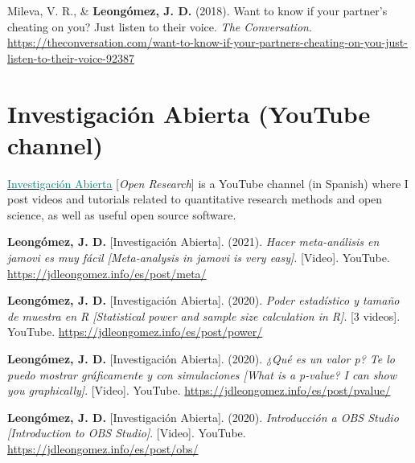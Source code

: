 \documentclass[11pt, a4paper]{awesome-cv}
\begin{document}
\leavevmode{}%
Mileva, V. R., \& \textbf{Leongómez, J. D.} (2018). {Want to know if
your partner's cheating on you? Just listen to their voice}. \emph{The
Conversation}.
\url{https://theconversation.com/want-to-know-if-your-partners-cheating-on-you-just-listen-to-their-voice-92387}

\endgroup

\hypertarget{investigaciuxf3n-abierta-youtube-channel}{%
\section{Investigación Abierta (YouTube
channel)}\label{investigaciuxf3n-abierta-youtube-channel}}

\href{https://www.youtube.com/c/InvestigaciónAbierta}{\textcolor{red}{\faYoutubePlay}
\textcolor{teal}{Investigación Abierta}} {[}\textit{Open Research}{]} is
a YouTube channel (in Spanish) where I post videos and tutorials related
to quantitative research methods and open science, as well as useful
open source software.

\begingroup
\setlength{\parindent}{-0.5in}
\setlength{\leftskip}{0.5in}

\hypertarget{refs_IA}{}
\leavevmode{}%
\textbf{Leongómez, J. D.} {[}Investigación Abierta{]}. (2021).
\emph{{Hacer meta-análisis en jamovi es muy fácil {[}Meta-analysis in
jamovi is very easy{]}}}. {[}Video{]}. YouTube.
\url{https://jdleongomez.info/es/post/meta/}

\leavevmode{}%
\textbf{Leongómez, J. D.} {[}Investigación Abierta{]}. (2020).
\emph{{Poder estadístico y tamaño de muestra en R {[}Statistical power
and sample size calculation in R{]}}}. {[}3 videos{]}. YouTube.
\url{https://jdleongomez.info/es/post/power/}

\leavevmode{}%
\textbf{Leongómez, J. D.} {[}Investigación Abierta{]}. (2020).
\emph{{¿Qué es un valor p? Te lo puedo mostrar gráficamente y con
simulaciones {[}What is a p-value? I can show you graphically{]}}}.
{[}Video{]}. YouTube. \url{https://jdleongomez.info/es/post/pvalue/}

\leavevmode{}%
\textbf{Leongómez, J. D.} {[}Investigación Abierta{]}. (2020).
\emph{{Introducción a OBS Studio {[}Introduction to OBS Studio{]}}}.
{[}Video{]}. YouTube. \url{https://jdleongomez.info/es/post/obs/}
\end{document}
